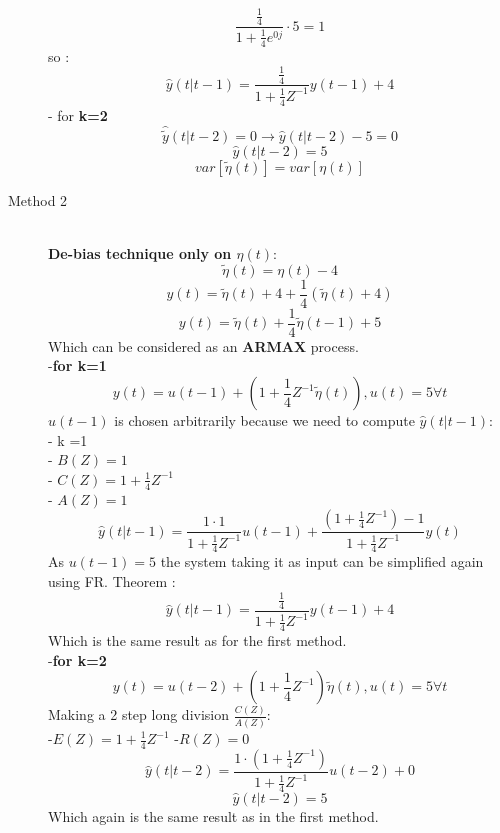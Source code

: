 \begin{description}
$$ \frac{\frac{1}{4}}{1+\frac{1}{4}e^{0j}} \cdot 5 = 1$$ 
so :
\[
\boxed{\hat{y}(t|t-1)= \frac{\frac{1}{4}}{1+\frac{1}{4}Z^{-1}}y(t-1)+4}
\]
- for \textbf{k=2}\\
$$ \hat{\tilde{y}}(t|t-2) = 0 \to \hat{y}(t|t-2) -5= 0$$
\[
\boxed{\hat{y}(t|t-2)=5}
\]
\[
\boxed{var[\tilde{\eta}(t)] =var[\eta(t)]}
\]
\item[Method 2]\hfill\\
\textbf{De-bias technique only on $\eta(t)$}:
$$ \tilde{\eta}(t) = \eta(t) -4$$
$$ y(t) = \tilde{\eta}(t)+4 + \frac{1}{4}(\tilde{\eta}(t)+4)$$
\[
\boxed{y(t) = \tilde{\eta}(t) +\frac{1}{4}\tilde{\eta}(t-1)+5}
\]
Which can be considered as an \textbf{ARMAX} process.\\
-\textbf{for k=1}\\
$$ y(t) = u(t-1)+(1+\frac{1}{4}Z^{-1}\tilde{\eta}(t)), u(t) = 5 \forall t$$
$u(t-1)$ is chosen arbitrarily because we need to compute $\hat{y}(t|t-1)$:\\
- k =1\\
- $B(Z)=1$\\
- $C(Z)=1+\frac{1}{4}Z^{-1}$\\
- $A(Z)=1$
$$\hat{y}(t|t-1)= \frac{1 \cdot 1}{1+\frac{1}{4}Z^{-1}}u(t-1) +\frac{(1+\frac{1}{4}Z^{-1})-1}{1+\frac{1}{4}Z^{-1}}y(t) $$
As $u(t-1)=5$ the system taking it as input can be simplified again using FR. Theorem :
\[
\boxed{\hat{y}(t|t-1)=\frac{\frac{1}{4}}{1+\frac{1}{4}Z^{-1}}y(t-1)+4}
\]
Which is the same result as for the first method.\\
-\textbf{for k=2}\\
$$ y(t) = u(t-2)+(1+\frac{1}{4}Z^{-1})\tilde{\eta}(t) , u(t) = 5 \forall t$$
Making a 2 step long division $\frac{C(Z)}{A(Z)}$:\\
-$E(Z)=1+\frac{1}{4}Z^{-1}$
-$R(Z)=0$
$$\hat{y}(t|t-2)= \frac{1 \cdot (1+\frac{1}{4}Z^{-1})}{1+\frac{1}{4}Z^{-1}}u(t-2)+0 $$
\[
\boxed{\hat{y}(t|t-2)=5}
\]
Which again is the same result as in the first method.
\end{description}
